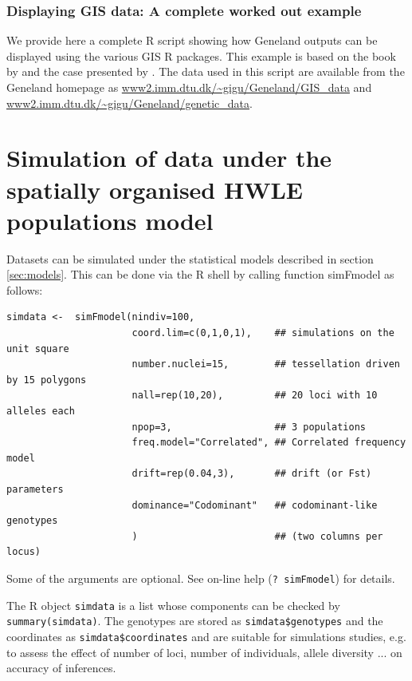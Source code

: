 \documentclass[a4paper,10pt]{article}
\begin{document}
\subsubsection[Displaying GIS data]{Displaying GIS data: A complete worked out example }\label{sec:AH}

We  provide here a complete R script showing how Geneland outputs can be displayed using the various GIS 
R packages. This example is based on the book by \citet{Bivand08} and the case presented by \citet{Hille12}. 
The data used in this script are available from the Geneland homepage as 
\url{www2.imm.dtu.dk/~gigu/Geneland/GIS_data} and \url{www2.imm.dtu.dk/~gigu/Geneland/genetic_data}.


\clearpage


\clearpage
\section{Simulation of data under the spatially organised HWLE populations model}\label{sim-HWLE}

Datasets can be simulated under the statistical models described in section \ref{sec:models}. 
This can be done via the R shell by calling function simFmodel as follows:

\begin{verbatim}
simdata <-  simFmodel(nindiv=100,
                      coord.lim=c(0,1,0,1),    ## simulations on the unit square
                      number.nuclei=15,        ## tessellation driven by 15 polygons
                      nall=rep(10,20),         ## 20 loci with 10 alleles each
                      npop=3,                  ## 3 populations
                      freq.model="Correlated", ## Correlated frequency model 
                      drift=rep(0.04,3),       ## drift (or Fst) parameters
                      dominance="Codominant"   ## codominant-like genotypes 
                      )                        ## (two columns per locus)
\end{verbatim}



Some of the arguments are optional. See on-line help (\texttt{? simFmodel}) for details.

The R object \texttt{simdata} is a list whose components can be checked by \texttt{summary(simdata)}. 
The genotypes are stored as \texttt{simdata\$genotypes} and the coordinates as \texttt{simdata\$coordinates} 
and are suitable for simulations studies, e.g. to assess the effect of number of loci, number of individuals, allele diversity ...
on accuracy of inferences. 
\end{document}
